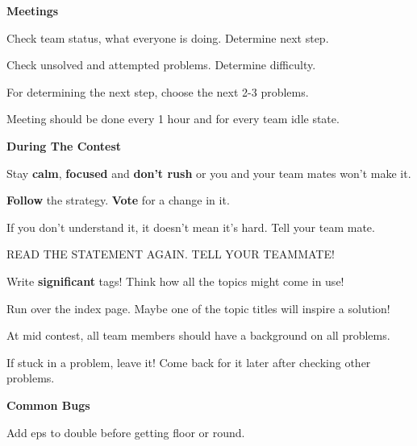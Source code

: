 \textbf{\large{Meetings}}
\begin{compactitem}
\item Check team status, what everyone is doing. Determine next step.
\item Check unsolved and attempted problems. Determine difficulty.
\item For determining the next step, choose the next 2-3 problems.
\item Meeting should be done every 1 hour and for every team idle state.
\end{compactitem}
\textbf{\large{During The Contest}}
\begin{compactitem}
\item Stay \textbf{calm}, \textbf{focused} and \textbf{don't rush} or you and your team mates won't make it.
\item \textbf{Follow} the strategy. \textbf{Vote} for a change in it.
\item If you don't understand it, it doesn't mean it's hard. Tell your team mate.
\item READ THE STATEMENT AGAIN. TELL YOUR TEAMMATE!
\item Write \textbf{significant} tags! Think how all the topics might come in use!
\item Run over the index page. Maybe one of the topic titles will inspire a solution!
\item At mid contest, all team members should have a background on all problems.
\item If stuck in a problem, leave it! Come back for it later after checking other problems.
\end{compactitem}
\textbf{\large{Common Bugs}}
\begin{compactitem}
\item Add eps to double before getting floor or round.
\end{compactitem}
